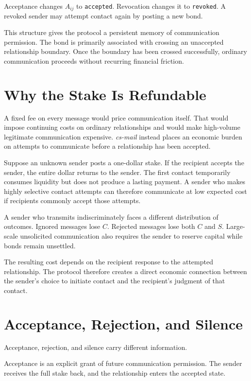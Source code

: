 \documentclass[11pt]{article}
\begin{document}
Acceptance changes $A_{ij}$ to \texttt{accepted}. Revocation changes it to \texttt{revoked}. A revoked sender may attempt contact again by posting a new bond.

This structure gives the protocol a persistent memory of communication permission. The bond is primarily associated with crossing an unaccepted relationship boundary. Once the boundary has been crossed successfully, ordinary communication proceeds without recurring financial friction.

\section{Why the Stake Is Refundable}

A fixed fee on every message would price communication itself. That would impose continuing costs on ordinary relationships and would make high-volume legitimate communication expensive. \textit{cs-mail} instead places an economic burden on attempts to communicate before a relationship has been accepted.

Suppose an unknown sender posts a one-dollar stake. If the recipient accepts the sender, the entire dollar returns to the sender. The first contact temporarily consumes liquidity but does not produce a lasting payment. A sender who makes highly selective contact attempts can therefore communicate at low expected cost if recipients commonly accept those attempts.

A sender who transmits indiscriminately faces a different distribution of outcomes. Ignored messages lose $C$. Rejected messages lose both $C$ and $S$. Large-scale unsolicited communication also requires the sender to reserve capital while bonds remain unsettled.

The resulting cost depends on the recipient response to the attempted relationship. The protocol therefore creates a direct economic connection between the sender's choice to initiate contact and the recipient's judgment of that contact.

\section{Acceptance, Rejection, and Silence}

Acceptance, rejection, and silence carry different information.

Acceptance is an explicit grant of future communication permission. The sender receives the full stake back, and the relationship enters the accepted state.
\end{document}
